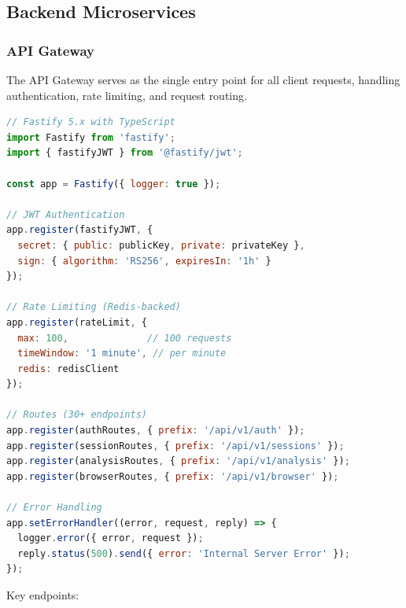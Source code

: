 \documentclass[11pt,letterpaper]{article}
\begin{document}
\subsection{Backend Microservices}

\subsubsection{API Gateway}

The API Gateway serves as the single entry point for all client requests, handling authentication, rate limiting, and request routing.

\begin{lstlisting}[language=JavaScript, caption=API Gateway Architecture]
// Fastify 5.x with TypeScript
import Fastify from 'fastify';
import { fastifyJWT } from '@fastify/jwt';

const app = Fastify({ logger: true });

// JWT Authentication
app.register(fastifyJWT, {
  secret: { public: publicKey, private: privateKey },
  sign: { algorithm: 'RS256', expiresIn: '1h' }
});

// Rate Limiting (Redis-backed)
app.register(rateLimit, {
  max: 100,              // 100 requests
  timeWindow: '1 minute', // per minute
  redis: redisClient
});

// Routes (30+ endpoints)
app.register(authRoutes, { prefix: '/api/v1/auth' });
app.register(sessionRoutes, { prefix: '/api/v1/sessions' });
app.register(analysisRoutes, { prefix: '/api/v1/analysis' });
app.register(browserRoutes, { prefix: '/api/v1/browser' });

// Error Handling
app.setErrorHandler((error, request, reply) => {
  logger.error({ error, request });
  reply.status(500).send({ error: 'Internal Server Error' });
});
\end{lstlisting}

Key endpoints:
\end{document}
